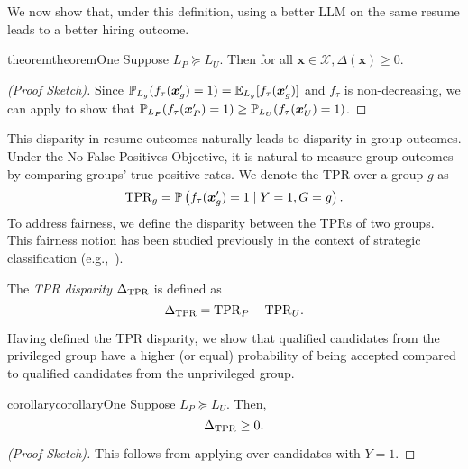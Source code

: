     We now show that, under this definition, using a better LLM on the same resume leads to a better hiring outcome.

    \begin{restatable}{theorem}{theoremOne}
        \label{thm: hiring outcome disparity}
        Suppose \(L_P \succeq L_U\). Then for all \(\bm{x} \in \mathcal{X}, \Delta(\bm{x}) \geq 0\).
    \end{restatable}
    \begin{proof}[(\textit{Proof Sketch})]
        Since \(\operatorname*{\mathbb{P}}_{L_g}(f_{\tau}(\bm{x}'_g) = 1) = \operatorname*{\mathbb{E}}_{L_g}[f_{\tau}(\bm{x}'_g)]\) and \(f_{\tau}\) is non-decreasing, we can apply  to show that \(\operatorname*{\mathbb{P}}_{L_P}(f_\tau(\bm{x}'_P) = 1) \geq \operatorname*{\mathbb{P}}_{L_U}(f_\tau(\bm{x}'_U) = 1)\).        
    \end{proof}

    This disparity in resume outcomes naturally leads to disparity in group outcomes. Under the No False Positives Objective, it is natural to measure group outcomes by comparing groups' true positive rates. We denote the TPR over a group \(g\) as
    \begin{equation*}
        \mathrm{TPR}_g = 
        \operatorname*{\mathbb{P}}\left( 
            f_\tau(\bm{x}'_g) = 1 \mid Y = 1, G = g
         \right).
    \end{equation*}
   To address fairness, we define the disparity between the TPRs of two groups. This fairness notion has been studied previously in the context of strategic classification (e.g.,~\citep{Keswani23}).
    \begin{definition}
        \label{def: TPR disparity}
        The \emph{TPR disparity} \(\Delta_{\mathrm{TPR}}\) is defined as 
        \[\Delta_{\mathrm{TPR}} = \mathrm{TPR}_P - \mathrm{TPR}_U.\]
    \end{definition}
 Having defined the TPR disparity, we show that qualified candidates from the privileged group have a higher (or equal) probability of being accepted compared to qualified candidates from the unprivileged group.
    \begin{restatable}{corollary}{corollaryOne}
        \label{cor: traditional is group-unfair}
        Suppose \(L_P \succeq L_U\). Then,
        \[\Delta_{\mathrm{TPR}} \geq 0.\]
    \end{restatable}
    \begin{proof}[(\textit{Proof Sketch})]
        This follows from applying  over candidates with \(Y = 1\).
    \end{proof}
    


